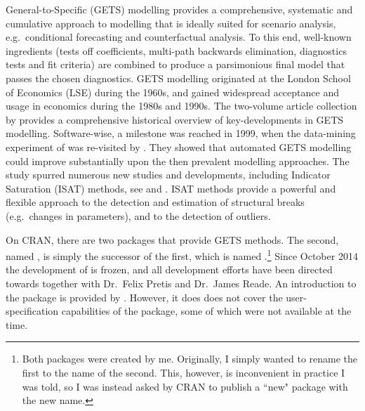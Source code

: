 
General-to-Specific (GETS) modelling provides a comprehensive, systematic and cumulative approach to modelling that is ideally suited for scenario analysis, e.g.\ conditional forecasting and counterfactual analysis. To this end, well-known ingredients (tests off coefficients, multi-path backwards elimination, diagnostics tests and fit criteria) are combined to produce a parsimonious final model that passes the chosen diagnostics. GETS modelling originated at the London School of Economics (LSE) during the 1960s, and gained widespread acceptance and usage in economics during the 1980s and 1990s. The two-volume article collection by \citet{CamposEricssonHendry2005} provides a comprehensive historical overview of key-developments in GETS modelling. Software-wise, a milestone was reached in 1999, when the data-mining experiment of \citet{Lovell83} was re-visited by \citet{Hooveretal99}. They showed that automated GETS modelling could improve substantially upon the then prevalent modelling approaches. The study spurred numerous new studies and developments, including Indicator Saturation (ISAT) methods, see \citet{HendryJohansenSantos2008} and \citet{CastleDoornikHendryPretis2015}. ISAT methods provide a powerful and flexible approach to the detection and estimation of structural breaks (e.g.\ changes in parameters), and to the detection of outliers.

On CRAN, there are two packages that provide GETS methods. The second, named , is simply the successor of the first, which is named .\footnote{Both packages were created by me. Originally, I simply wanted to rename the first to the name of the second. This, however, is inconvenient in practice I was told, so I was instead asked by CRAN to publish a ``new" package with the new name.} Since October 2014 the development of  is frozen, and all development efforts have been directed towards  together with Dr.\ Felix Pretis and Dr.\ James Reade. An introduction to the  package is provided by \cite{PretisReadeSucarrat2018}. However, it does does not cover the user-specification capabilities of the package, some of which were not available at the time.

